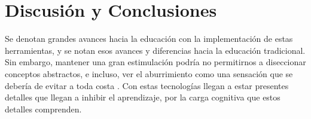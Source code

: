 \section{Discusi\'on y Conclusiones}

Se denotan grandes avances hacia la educaci{\'o}n con la implementaci{\'o}n de estas herramientas, y se notan esos avances y diferencias hacia la educaci\'on tradicional. Sin embargo, mantener una gran estimulaci\'on podr\'ia no permitirnos a diseccionar conceptos abstractos, e incluso, ver el aburrimiento como una sensaci\'on que se deber\'ia de evitar a toda costa \parencite{han2010sociedad}. Con estas tecnolog\'ias llegan a estar presentes detalles que llegan a inhibir el aprendizaje, por la carga cognitiva que estos detalles comprenden. \parencite{OJE2023100033}
